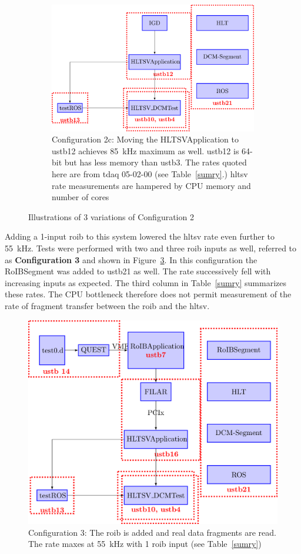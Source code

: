 \begin{figure}
\begin{subfigure}{0.4\textwidth}
  \includegraphics[width=\textwidth]{figures/confTwoC.png}
  \caption{Configuration 2c: Moving the HLTSVApplication to ustb12 achieves 85\ kHz maximum as well. ustb12 
is 64-bit but has less memory than ustb3. The rates quoted here are 
from tdaq 05-02-00 (see Table~\ref{sumry}.) \acrshort{hltsv} rate measurements are 
hampered by CPU memory and number of cores}
  \label{confTwoABCc}
\end{subfigure}
\caption{Illustrations of 3 variations of Configuration 2}
\end{figure}

\par Adding a 1-input \acrshort{roib} to this system lowered the \acrshort{hltsv} rate 
even further to 55\ kHz. Tests were performed with two and three \acrshort{roib} inputs
 as well, referred to as {\bf Configuration 3} and shown in Figure~\ref{confThree}. 
In this configuration the RoIBSegment was added to ustb21 as well. The rate successively fell with increasing 
inputs as expected. The third column in Table~\ref{sumry} summarizes these rates. The CPU bottleneck 
therefore does not permit measurement of the rate of fragment transfer 
between the \acrshort{roib} and the \acrshort{hltsv}.  

\begin{figure}[!h]
\centering
\includegraphics[width=0.7\linewidth]{figures/conf3.png}
\caption{Configuration 3: The \acrshort{roib} is added and real data fragments are 
read. The rate maxes at 55\ kHz with 1 \acrshort{roib} input (see Table~\ref{sumry}) }
\label{confThree}
\end{figure}

